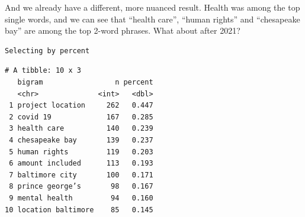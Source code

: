 \documentclass[
  letterpaper,
  DIV=11,
  numbers=noendperiod]{scrreprt}
\newenvironment{Shaded}{\begin{snugshade}}{\end{snugshade}}
\newcommand{\AttributeTok}[1]{\textcolor[rgb]{0.40,0.45,0.13}{#1}}
\newcommand{\ConstantTok}[1]{\textcolor[rgb]{0.56,0.35,0.01}{#1}}
\newcommand{\DecValTok}[1]{\textcolor[rgb]{0.68,0.00,0.00}{#1}}
\newcommand{\FunctionTok}[1]{\textcolor[rgb]{0.28,0.35,0.67}{#1}}
\newcommand{\NormalTok}[1]{\textcolor[rgb]{0.00,0.23,0.31}{#1}}
\newcommand{\SpecialCharTok}[1]{\textcolor[rgb]{0.37,0.37,0.37}{#1}}
\newcommand{\StringTok}[1]{\textcolor[rgb]{0.13,0.47,0.30}{#1}}
\begin{document}
And we already have a different, more nuanced result. Health was among
the top single words, and we can see that ``health care'', ``human
rights'' and ``chesapeake bay'' are among the top 2-word phrases. What
about after 2021?

\begin{Shaded}
\end{Shaded}

\begin{verbatim}
Selecting by percent
\end{verbatim}

\begin{verbatim}
# A tibble: 10 x 3
   bigram                 n percent
   <chr>              <int>   <dbl>
 1 project location     262   0.447
 2 covid 19             167   0.285
 3 health care          140   0.239
 4 chesapeake bay       139   0.237
 5 human rights         119   0.203
 6 amount included      113   0.193
 7 baltimore city       100   0.171
 8 prince george’s       98   0.167
 9 mental health         94   0.160
10 location baltimore    85   0.145
\end{verbatim}
\end{document}
